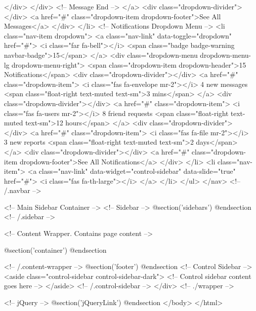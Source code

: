                 </div>
              </div>
              <!-- Message End -->
            </a>
            <div class="dropdown-divider"></div>
            <a href="#" class="dropdown-item dropdown-footer">See All Messages</a>
          </div>
        </li>
        <!-- Notifications Dropdown Menu -->
        <li class="nav-item dropdown">
          <a class="nav-link" data-toggle="dropdown" href="#">
            <i class="far fa-bell"></i>
            <span class="badge badge-warning navbar-badge">15</span>
          </a>
          <div class="dropdown-menu dropdown-menu-lg dropdown-menu-right">
            <span class="dropdown-item dropdown-header">15 Notifications</span>
            <div class="dropdown-divider"></div>
            <a href="#" class="dropdown-item">
              <i class="fas fa-envelope mr-2"></i> 4 new messages
              <span class="float-right text-muted text-sm">3 mins</span>
            </a>
            <div class="dropdown-divider"></div>
            <a href="#" class="dropdown-item">
              <i class="fas fa-users mr-2"></i> 8 friend requests
              <span class="float-right text-muted text-sm">12 hours</span>
            </a>
            <div class="dropdown-divider"></div>
            <a href="#" class="dropdown-item">
              <i class="fas fa-file mr-2"></i> 3 new reports
              <span class="float-right text-muted text-sm">2 days</span>
            </a>
            <div class="dropdown-divider"></div>
            <a href="#" class="dropdown-item dropdown-footer">See All Notifications</a>
          </div>
        </li>
        <li class="nav-item">
          <a class="nav-link" data-widget="control-sidebar" data-slide="true" href="#">
            <i class="fas fa-th-large"></i>
          </a>
        </li>
      </ul>
    </nav>
    <!-- /.navbar -->
  
    <!-- Main Sidebar Container -->   
      <!-- Sidebar -->
    @section('sidebars')
    @endsection
      <!-- /.sidebar -->
      
    <!-- Content Wrapper. Contains page content -->
  
    @section('container')
    @endsection

    <!-- /.content-wrapper -->
    @section('footer')
    @endsection
    <!-- Control Sidebar -->
    <aside class="control-sidebar control-sidebar-dark">
      <!-- Control sidebar content goes here -->
    </aside>
    <!-- /.control-sidebar -->
  </div>
<!-- ./wrapper -->

<!-- jQuery -->
@section('jQueryLink')
@endsection
</body>
</html>
